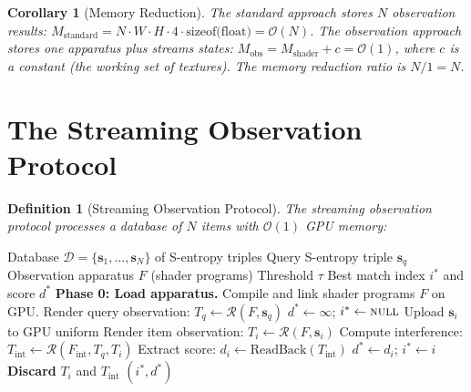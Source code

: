 \documentclass[11pt,twocolumn,a4paper]{article}
\newtheorem{corollary}[theorem]{Corollary}
\newtheorem{definition}[theorem]{Definition}
\newcommand{\BigO}{\mathcal{O}}
\newcommand{\Rend}{\mathcal{R}}
\begin{document}
\begin{corollary}[Memory Reduction]
\label{cor:memory-reduction}
The standard approach stores $N$ observation results:
$M_{\mathrm{standard}} = N \cdot W \cdot H \cdot 4 \cdot
\text{sizeof(float)} = \BigO(N)$.
The observation approach stores one apparatus plus streams states:
$M_{\mathrm{obs}} = M_{\mathrm{shader}} + c = \BigO(1)$,
where $c$ is a constant (the working set of textures).
The memory reduction ratio is $N / 1 = N$.
\end{corollary}


\section{The Streaming Observation Protocol}
\label{sec:streaming}

\begin{definition}[Streaming Observation Protocol]
\label{def:streaming-protocol}
The streaming observation protocol processes a database of $N$ items
with $\BigO(1)$ GPU memory:
\end{definition}

\begin{algorithm}[H]
\caption{Streaming Observation Protocol}
\label{alg:streaming}
\begin{algorithmic}[1]
\Require Database $\mathcal{D} = \{\bm{s}_1, \ldots, \bm{s}_N\}$
  of S-entropy triples
\Require Query S-entropy triple $\bm{s}_q$
\Require Observation apparatus $F$ (shader programs)
\Require Threshold $\tau$
\Ensure Best match index $i^*$ and score $d^*$
\State \textbf{Phase 0: Load apparatus.}
  Compile and link shader programs $F$ on GPU.
\State Render query observation:
  $T_q \gets \Rend(F, \bm{s}_q)$
  \Comment{$\BigO(1)$, one draw call}
\State $d^* \gets \infty$; $i^* \gets \textsc{null}$
  \State Upload $\bm{s}_i$ to GPU uniform
  \State Render item observation:
    $T_i \gets \Rend(F, \bm{s}_i)$
    \Comment{$\BigO(1)$}
  \State Compute interference:
    $T_{\mathrm{int}} \gets \Rend(F_{\mathrm{int}}, T_q, T_i)$
    \Comment{$\BigO(1)$}
  \State Extract score:
    $d_i \gets \text{ReadBack}(T_{\mathrm{int}})$
    \Comment{$\BigO(1)$}
    \State $d^* \gets d_i$; $i^* \gets i$
  \EndIf
  \State \textbf{Discard} $T_i$ and $T_{\mathrm{int}}$
\EndFor
\State \Return $(i^*, d^*)$
\end{algorithmic}
\end{algorithm}
\end{document}
